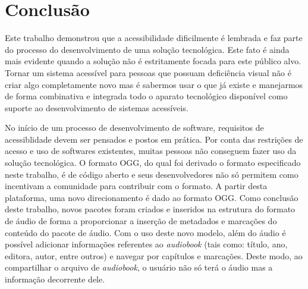 \chapter[Conclusão]{Conclusão}\label{cap5}




Este trabalho demonstrou que a acessibilidade dificilmente é lembrada e faz parte do processo do desenvolvimento de uma solução tecnológica. Este fato é ainda mais evidente quando a solução não é estritamente focada para este público alvo. Tornar um sistema acessível para pessoas que possuam deficiência visual não é criar algo completamente novo mas é sabermos usar o que já existe e manejarmos de forma combinativa e integrada todo o aparato tecnológico disponível como suporte ao desenvolvimento de sistemas acessíveis. 

No início de um processo de desenvolvimento de software, requisitos de acessiblidade devem ser pensados e postos em prática. Por conta das restrições de acesso e uso de softwares existentes, muitas pessoas não conseguem fazer uso da solução tecnológica. O formato OGG, do qual foi derivado o formato especificado neste trabalho, é de código aberto e seus desenvolvedores não só permitem como incentivam a comunidade para contribuir com o formato. A partir desta plataforma, uma novo direcionamento é dado ao formato OGG. Como conclusão deste trabalho, novos pacotes foram criados e inseridos na estrutura do formato de áudio de forma a proporcionar a inserção de metadados e marcações do conteúdo do pacote de áudio. Com o uso deste novo modelo, além do áudio é possível adicionar informações referentes ao \textit{audiobook} (tais como: título, ano, editora, autor, entre outros) e navegar por capítulos e marcações. Deste modo, ao compartilhar o arquivo de \textit{audiobook}, o usuário não só terá o áudio mas a informação decorrente dele.

